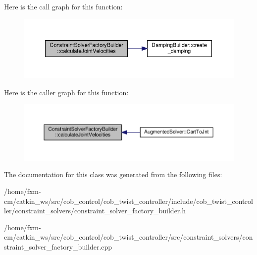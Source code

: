 Here is the call graph for this function\-:
\nopagebreak
\begin{figure}[H]
\begin{center}
\leavevmode
\includegraphics[width=350pt]{classConstraintSolverFactoryBuilder_a1d2eb736030aeea9156a20031d14e48a_cgraph}
\end{center}
\end{figure}




Here is the caller graph for this function\-:
\nopagebreak
\begin{figure}[H]
\begin{center}
\leavevmode
\includegraphics[width=350pt]{classConstraintSolverFactoryBuilder_a1d2eb736030aeea9156a20031d14e48a_icgraph}
\end{center}
\end{figure}




The documentation for this class was generated from the following files\-:\begin{DoxyCompactItemize}
\item 
/home/fxm-\/cm/catkin\-\_\-ws/src/cob\-\_\-control/cob\-\_\-twist\-\_\-controller/include/cob\-\_\-twist\-\_\-controller/constraint\-\_\-solvers/constraint\-\_\-solver\-\_\-factory\-\_\-builder.\-h\item 
/home/fxm-\/cm/catkin\-\_\-ws/src/cob\-\_\-control/cob\-\_\-twist\-\_\-controller/src/constraint\-\_\-solvers/constraint\-\_\-solver\-\_\-factory\-\_\-builder.\-cpp\end{DoxyCompactItemize}
